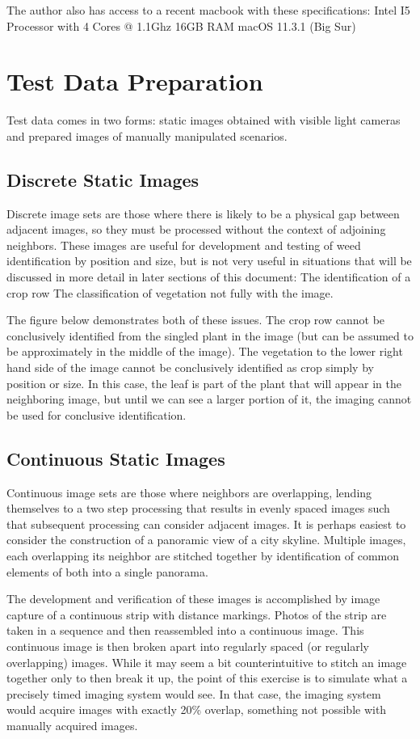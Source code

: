 \documentclass[letterpaper]{article}
\begin{document}
The author also has access to a recent macbook with these specifications:
Intel I5 Processor with 4 Cores @ 1.1Ghz
16GB RAM
macOS 11.3.1 (Big Sur)

\section{Test Data Preparation}
Test data comes in two forms: static images obtained with visible light cameras and prepared images of manually manipulated scenarios.

\subsection{Discrete Static Images}
Discrete image sets are those where there is likely to be a physical gap between adjacent images, so they must be processed without the context of adjoining neighbors. These images are useful for development and testing of weed identification by position and size, but is not very useful in situations that will be discussed in more detail in later sections of this document:
The identification of a crop row
The classification of vegetation not fully with the image.

The figure below demonstrates both of these issues. The crop row cannot be conclusively identified from the singled plant in the image (but can be assumed to be approximately in the middle of the image). The vegetation to the lower right hand side of the image cannot be conclusively identified as crop simply by position or size. In this case, the leaf is part of the plant that will appear in the neighboring image, but until we can see a larger portion of it, the imaging cannot be used for conclusive identification.


\subsection{Continuous Static Images}
Continuous image sets are those where neighbors are overlapping, lending themselves to a two step processing that results in evenly spaced images such that subsequent processing can consider adjacent images. It is perhaps easiest to consider the construction of a panoramic view of a city skyline. Multiple images, each overlapping its neighbor are stitched together by identification of common elements of both into a single panorama.

The development and verification of these images is accomplished by image capture of a continuous strip with distance markings. Photos of the strip are taken in a sequence and then reassembled into a continuous image. This continuous image is then broken apart into regularly spaced (or regularly overlapping) images. While it may seem a bit counterintuitive to stitch an image together only to then break it up, the point of this exercise is to simulate what a precisely timed imaging system would see. In that case, the imaging system would acquire images with exactly 20\% overlap, something not possible with manually acquired images. 
\end{document}

